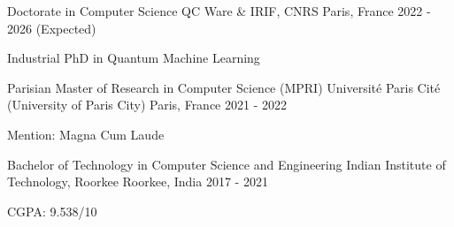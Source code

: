 

\begin{cventries}

  \cventry
    {Doctorate in Computer Science} %
    {QC Ware \& IRIF, CNRS} %
    {Paris, France} %
    {2022 - 2026 (Expected)} %
    {
      \begin{cvitems} %
        \item {Industrial PhD in Quantum Machine Learning}
      \end{cvitems}
    }

  \cventry
    {Parisian Master of Research in Computer Science (MPRI)} %
    {Université Paris Cité (University of Paris City)} %
    {Paris, France} %
    {2021 - 2022} %
    {
      \begin{cvitems} %
        \item {Mention: Magna Cum Laude}
      \end{cvitems}
    }

  \cventry
    {Bachelor of Technology in Computer Science and Engineering} %
    {Indian Institute of Technology, Roorkee} %
    {Roorkee, India} %
    {2017 - 2021} %
    {
      \begin{cvitems} %
        \item {CGPA: 9.538/10}
      \end{cvitems}
    }



\end{cventries}
